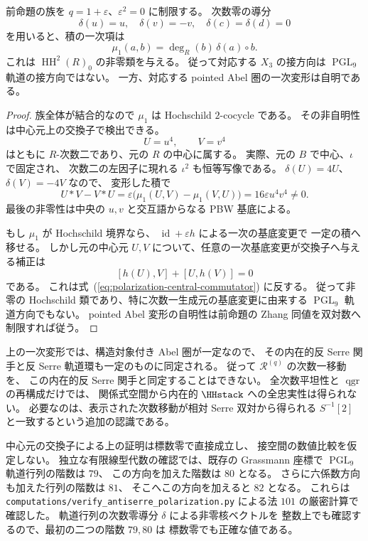 \begin{proposition}
\label{prop:antiserre-polarization-tangent}
前命題の族を $q=1+\varepsilon$、$\varepsilon^2=0$ に制限する。
次数零の導分
\[
 \delta(u)=u,\quad\delta(v)=-v,\quad\delta(c)=\delta(d)=0
\]
を用いると、積の一次項は
\[
 \mu_1(a,b)=\deg_R(b)\,\delta(a)\mathbin{\circ}b.
\]
これは $\operatorname{HH}^2(R)_0$ の非零類を与える。
従って対応する $X_3$ の接方向は $\operatorname{PGL}_9$ 軌道の接方向ではない。
一方、対応する pointed Abel 圏の一次変形は自明である。
\end{proposition}
\begin{proof}
族全体が結合的なので $\mu_1$ は Hochschild $2$-cocycle である。
その非自明性は中心元上の交換子で検出できる。
\[
 U=u^4,\qquad V=v^4
\]
はともに $R$-次数二であり、元の $R$ の中心に属する。
実際、元の $B$ で中心、$\iota$ で固定され、
次数二の左因子に現れる $\iota^2$ も恒等写像である。
$\delta(U)=4U$、$\delta(V)=-4V$ なので、
変形した積で
\[
 U*V-V*U
 =\varepsilon\bigl(\mu_1(U,V)-\mu_1(V,U)\bigr)
 =16\varepsilon u^4v^4\ne0.
 \tag{P-comm}\label{eq:polarization-central-commutator}
\]
最後の非零性は中央の $u,v$ と交互語からなる PBW 基底による。

もし $\mu_1$ が Hochschild 境界なら、
$\operatorname{id}+\varepsilon h$ による一次の基底変更で
一定の積へ移せる。
しかし元の中心元 $U,V$ について、任意の一次基底変更が交換子へ与える補正は
\[
 [h(U),V]+[U,h(V)]=0
\]
である。
これは式~(\ref{eq:polarization-central-commutator}) に反する。
従って非零の Hochschild 類であり、特に次数一生成元の基底変更に由来する
$\operatorname{PGL}_9$ 軌道方向でもない。
pointed Abel 変形の自明性は前命題の Zhang 同値を双対数へ制限すれば従う。
\end{proof}

\begin{remark}
上の一次変形では、構造対象付き Abel 圏が一定なので、
その内在的反 Serre 関手と反 Serre 軌道環も一定のものに同定される。
従って $\mathcal R^{(q)}$ の次数一移動を、
この内在的反 Serre 関手と同定することはできない。
全次数平坦性と $\operatorname{qgr}$ の再構成だけでは、
関係式空間から内在的 $\HHstack$ への全忠実性は得られない。
必要なのは、表示された次数移動が相対 Serre 双対から得られる
$S^{-1}[2]$ と一致するという追加の認識である。

中心元の交換子による上の証明は標数零で直接成立し、
接空間の数値比較を仮定しない。
独立な有限線型代数の確認では、既存の Grassmann 座標で
$\operatorname{PGL}_9$ 軌道行列の階数は $79$、
この方向を加えた階数は $80$ となる。
さらに六係数方向も加えた行列の階数は $81$、
そこへこの方向を加えると $82$ となる。
これらは
\texttt{computations/verify\_antiserre\_polarization.py}
による法 $101$ の厳密計算で確認した。
軌道行列の次数零導分 $\delta$ による非零核ベクトルを
整数上でも確認するので、最初の二つの階数 $79,80$ は
標数零でも正確な値である。
\end{remark}
